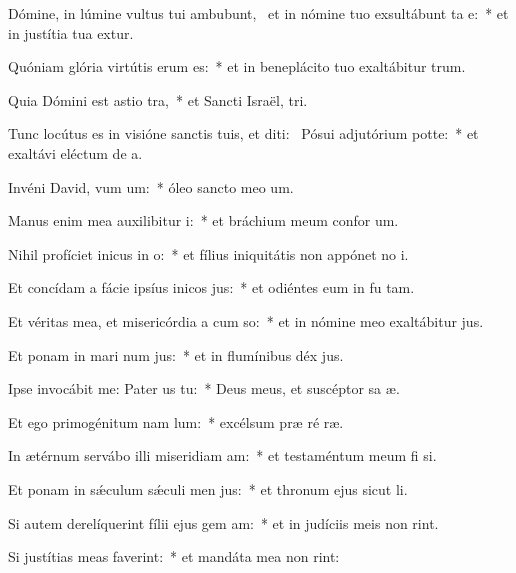 \item Dómine, in lúmine vultus tui ambubunt,~\pscross{} et in nómine tuo exsultábunt ta e:~* et in justítia tua extur.
\item Quóniam glória virtútis erum  es:~* et in beneplácito tuo exaltábitur  trum.
\item Quia Dómini est astio tra,~* et Sancti Israël,  tri.
\item Tunc locútus es in visióne sanctis tuis, et diti:~\pscross{} Pósui adjutórium  potte:~* et exaltávi eléctum de  a.
\item Invéni David, vum um:~* óleo sancto meo  um.
\item Manus enim mea auxilibitur i:~* et bráchium meum confor um.
\item Nihil profíciet inicus in o:~* et fílius iniquitátis non appónet no i.
\item Et concídam a fácie ipsíus inicos jus:~* et odiéntes eum in fu tam.
\item Et véritas mea, et misericórdia a cum so:~* et in nómine meo exaltábitur  jus.
\item Et ponam in mari num jus:~* et in flumínibus déx jus.
\item Ipse invocábit me: Pater us  tu:~* Deus meus, et suscéptor sa æ.
\item Et ego primogénitum nam lum:~* excélsum præ ré ræ.
\item In ætérnum servábo illi miseridiam am:~* et testaméntum meum fi si.
\item Et ponam in sǽculum sǽculi men jus:~* et thronum ejus sicut  li.
\item Si autem derelíquerint fílii ejus gem am:~* et in judíciis meis non rint.
\item Si justítias meas faverint:~* et mandáta mea non rint:
